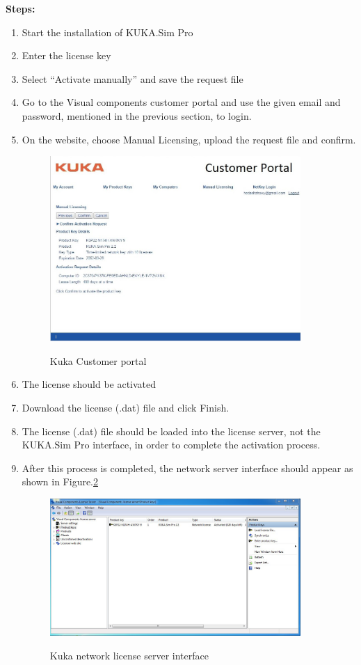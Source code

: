 \textbf {Steps:}
\begin{enumerate}
\item Start the installation of KUKA.Sim Pro 
\item Enter the license key
\item Select “Activate manually” and save the request file
\item Go to the Visual components customer portal and use the given email and password, mentioned in the previous section, to login.
\item On the website, choose Manual Licensing, upload the request file and confirm.
\begin{figure}[h]
\centering
\includegraphics[width=0.9\textwidth]{figures/parts/44}
\label{fig:44}
\caption{Kuka Customer portal}
\end{figure}

\item The license should be activated
\item Download the license (.dat) file and click Finish. 
\item The license (.dat) file should be loaded into the license server, not the KUKA.Sim Pro interface, in order to complete the activation process.
\item After this process is completed, the network server interface should appear as shown in Figure.\ref{fig:55}
    \begin{figure}[h]
        \centering
        \includegraphics[width=0.9\textwidth]{figures/parts/55}
        \label{fig:55}
        \caption{Kuka network license server interface}
    \end{figure}
\end{enumerate}